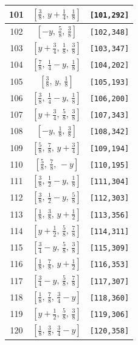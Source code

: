 \documentclass[fleqn,8pt]{jsarticle}
\begin{document}
\begin{longtable}{ccc}
101 & $\left[ \frac{3}{8},\, y + \frac{1}{4},\, \frac{1}{8} \right]$ & {\tt [101,292]} \\ \hline
102 & $\left[ - y,\, \frac{5}{8},\, \frac{3}{8} \right]$ & {\tt [102,348]} \\ \hline
103 & $\left[ y + \frac{3}{4},\, \frac{1}{8},\, \frac{3}{8} \right]$ & {\tt [103,347]} \\ \hline
104 & $\left[ \frac{7}{8},\, \frac{1}{4} - y,\, \frac{1}{8} \right]$ & {\tt [104,202]} \\ \hline
105 & $\left[ \frac{3}{8},\, y,\, \frac{1}{8} \right]$ & {\tt [105,193]} \\ \hline
106 & $\left[ \frac{3}{8},\, \frac{1}{4} - y,\, \frac{1}{8} \right]$ & {\tt [106,200]} \\ \hline
107 & $\left[ y + \frac{3}{4},\, \frac{5}{8},\, \frac{3}{8} \right]$ & {\tt [107,343]} \\ \hline
108 & $\left[ - y,\, \frac{1}{8},\, \frac{3}{8} \right]$ & {\tt [108,342]} \\ \hline
109 & $\left[ \frac{5}{8},\, \frac{7}{8},\, y + \frac{3}{4} \right]$ & {\tt [109,194]} \\ \hline
110 & $\left[ \frac{5}{8},\, \frac{7}{8},\, - y \right]$ & {\tt [110,195]} \\ \hline
111 & $\left[ \frac{3}{8},\, \frac{1}{2} - y,\, \frac{1}{8} \right]$ & {\tt [111,304]} \\ \hline
112 & $\left[ \frac{3}{8},\, \frac{1}{2} - y,\, \frac{5}{8} \right]$ & {\tt [112,303]} \\ \hline
113 & $\left[ \frac{1}{8},\, \frac{3}{8},\, y + \frac{1}{2} \right]$ & {\tt [113,356]} \\ \hline
114 & $\left[ y + \frac{1}{2},\, \frac{5}{8},\, \frac{7}{8} \right]$ & {\tt [114,311]} \\ \hline
115 & $\left[ \frac{3}{4} - y,\, \frac{5}{8},\, \frac{3}{8} \right]$ & {\tt [115,309]} \\ \hline
116 & $\left[ \frac{1}{8},\, \frac{7}{8},\, y + \frac{1}{2} \right]$ & {\tt [116,353]} \\ \hline
117 & $\left[ \frac{3}{4} - y,\, \frac{5}{8},\, \frac{7}{8} \right]$ & {\tt [117,307]} \\ \hline
118 & $\left[ \frac{1}{8},\, \frac{7}{8},\, \frac{3}{4} - y \right]$ & {\tt [118,360]} \\ \hline
119 & $\left[ y + \frac{1}{2},\, \frac{5}{8},\, \frac{3}{8} \right]$ & {\tt [119,306]} \\ \hline
120 & $\left[ \frac{1}{8},\, \frac{3}{8},\, \frac{3}{4} - y \right]$ & {\tt [120,358]} \\ \hline

\end{longtable}
\end{document}
